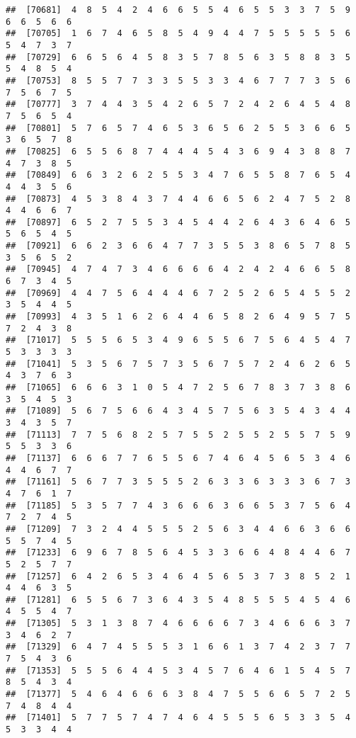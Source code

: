 \documentclass[
]{book}
\begin{document}
\begin{verbatim}
##  [70681]  4  8  5  4  2  4  6  6  5  5  4  6  5  5  3  3  7  5  9  6  6  5  6  6
##  [70705]  1  6  7  4  6  5  8  5  4  9  4  4  7  5  5  5  5  5  6  5  4  7  3  7
##  [70729]  6  6  5  6  4  5  8  3  5  7  8  5  6  3  5  8  8  3  5  5  4  8  5  4
##  [70753]  8  5  5  7  7  3  3  5  5  3  3  4  6  7  7  7  3  5  6  7  5  6  7  5
##  [70777]  3  7  4  4  3  5  4  2  6  5  7  2  4  2  6  4  5  4  8  7  5  6  5  4
##  [70801]  5  7  6  5  7  4  6  5  3  6  5  6  2  5  5  3  6  6  5  3  6  5  7  8
##  [70825]  6  5  5  6  8  7  4  4  4  5  4  3  6  9  4  3  8  8  7  4  7  3  8  5
##  [70849]  6  6  3  2  6  2  5  5  3  4  7  6  5  5  8  7  6  5  4  4  4  3  5  6
##  [70873]  4  5  3  8  4  3  7  4  4  6  6  5  6  2  4  7  5  2  8  4  4  6  6  7
##  [70897]  6  5  2  7  5  5  3  4  5  4  4  2  6  4  3  6  4  6  5  5  6  5  4  5
##  [70921]  6  6  2  3  6  6  4  7  7  3  5  5  3  8  6  5  7  8  5  3  5  6  5  2
##  [70945]  4  7  4  7  3  4  6  6  6  6  4  2  4  2  4  6  6  5  8  6  7  3  4  5
##  [70969]  4  4  7  5  6  4  4  4  6  7  2  5  2  6  5  4  5  5  2  3  5  4  4  5
##  [70993]  4  3  5  1  6  2  6  4  4  6  5  8  2  6  4  9  5  7  5  7  2  4  3  8
##  [71017]  5  5  5  6  5  3  4  9  6  5  5  6  7  5  6  4  5  4  7  5  3  3  3  3
##  [71041]  5  3  5  6  7  5  7  3  5  6  7  5  7  2  4  6  2  6  5  4  3  7  6  3
##  [71065]  6  6  6  3  1  0  5  4  7  2  5  6  7  8  3  7  3  8  6  3  5  4  5  3
##  [71089]  5  6  7  5  6  6  4  3  4  5  7  5  6  3  5  4  3  4  4  3  4  3  5  7
##  [71113]  7  7  5  6  8  2  5  7  5  5  2  5  5  2  5  5  7  5  9  5  5  3  3  6
##  [71137]  6  6  6  7  7  6  5  5  6  7  4  6  4  5  6  5  3  4  6  4  4  6  7  7
##  [71161]  5  6  7  7  3  5  5  5  2  6  3  3  6  3  3  3  6  7  3  4  7  6  1  7
##  [71185]  5  3  5  7  7  4  3  6  6  6  3  6  6  5  3  7  5  6  4  7  2  7  4  5
##  [71209]  7  3  2  4  4  5  5  5  2  5  6  3  4  4  6  6  3  6  6  5  5  7  4  5
##  [71233]  6  9  6  7  8  5  6  4  5  3  3  6  6  4  8  4  4  6  7  5  2  5  7  7
##  [71257]  6  4  2  6  5  3  4  6  4  5  6  5  3  7  3  8  5  2  1  4  4  6  3  5
##  [71281]  6  5  5  6  7  3  6  4  3  5  4  8  5  5  5  4  5  4  6  4  5  5  4  7
##  [71305]  5  3  1  3  8  7  4  6  6  6  6  7  3  4  6  6  6  3  7  3  4  6  2  7
##  [71329]  6  4  7  4  5  5  5  3  1  6  6  1  3  7  4  2  3  7  7  7  5  4  3  6
##  [71353]  5  5  5  6  4  4  5  3  4  5  7  6  4  6  1  5  4  5  7  8  5  4  3  4
##  [71377]  5  4  6  4  6  6  6  3  8  4  7  5  5  6  6  5  7  2  5  7  4  8  4  4
##  [71401]  5  7  7  5  7  4  7  4  6  4  5  5  5  6  5  3  3  5  4  5  3  3  4  4

\end{verbatim}
\end{document}
